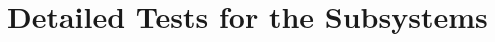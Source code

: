 \documentclass[a4paper,12pt]{article}
\begin{document}
	
	
		
		
	
		
		
	
		
	
	
		
		
	
		
		
	
	
	

	
	
	
	
	
	
	\section{Detailed Tests for the Subsystems}\label{test_sec}
	
\end{document}
